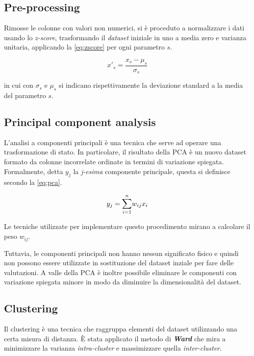 \subsection{Pre-processing}
Rimosse le colonne con valori non numerici, si è proceduto a normalizzare i dati usando lo \textit{z-score}, trasformando il \textit{dataset} iniziale in uno a media zero e varianza unitaria, applicando la \cref{eq:zscore} per ogni parametro $s$.

\begin{equation}
    x'_s = \frac{x_s - \mu_s} {\sigma_s}
    \label{eq:zscore}
\end{equation}

 in cui con $\sigma_s$ e $\mu_s$ si indicano rispettivamente la deviazione standard a la media del parametro $s$.

 \subsection{Principal component analysis}
L'analisi a componenti principali è una tecnica che serve ad operare una trasformazione di stato. In particolare, il risultato della PCA è un nuovo dataset formato da colonne incorrelate ordinate in termini di variazione spiegata. Formalmente, detta $y_j$ la \textit{j-esima} componente principale, questa si definisce secondo la \cref{eq:pca}.

\begin{equation}
    y_j =  \mathlarger{\sum}_{i=1}^n w_{ij} x_{i}
    \label{eq:pca}
\end{equation}

Le tecniche utilizzate per implementare questo procedimento mirano a calcolare il peso $w_{ij}$.

Tuttavia, le componenti principali non hanno nessun significato fisico e quindi non possono essere utilizzate in sostituzione del dataset inziale per fare delle valutazioni. A valle della
PCA è inoltre possibile eliminare le componenti con variazione spiegata minore in modo da diminuire la dimensionalità del dataset.

\subsection{Clustering}
Il clustering è una tecnica che raggruppa elementi del dataset utilizzando una certa misura di distanza. È stata applicato il metodo di \textbf{\textit{Ward}} che mira a minimizzare la varianza \textit{intra-cluster} e massimizzare quella \textit{inter-cluster}. 

